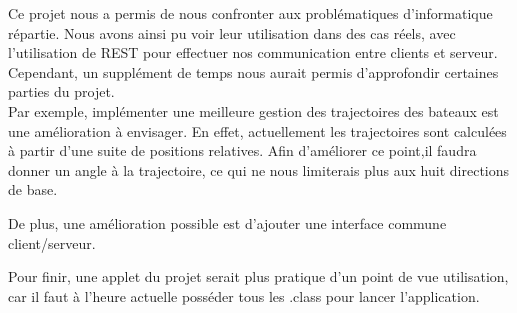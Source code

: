 
Ce projet nous a permis de nous confronter aux problématiques d'informatique répartie. Nous avons ainsi pu voir leur utilisation dans des cas réels, avec l'utilisation de REST pour effectuer nos communication entre clients et serveur.\\ 

Cependant, un supplément de temps nous aurait permis d'approfondir certaines parties du projet. \\
Par exemple, implémenter une meilleure gestion des trajectoires des bateaux est une amélioration à envisager. En effet, actuellement les trajectoires sont calculées à partir d'une suite de positions relatives. Afin d'améliorer ce point,il faudra donner un angle à la trajectoire, ce qui ne nous limiterais plus aux huit directions de base.

De plus, une amélioration possible est d'ajouter une interface commune client/serveur.

Pour finir, une applet du projet serait plus pratique d'un point de vue utilisation, car il faut à l'heure actuelle posséder tous les .class pour lancer l'application. 